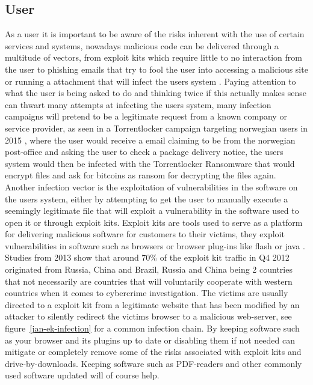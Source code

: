 \subsection{User}
As a user it is important to be aware of the risks inherent with the use of certain services and systems, nowadays malicious code can be delivered through a multitude of vectors, from exploit kits which require little to no interaction from the user to phishing emails that try to fool the user into accessing a malicious site or running a attachment that will infect the users system \cite{jan-brewer}. 
Paying attention to what the user is being asked to do and thinking twice if this actually makes sense can thwart many attempts at infecting the users system, many infection campaigns will pretend to be a legitimate request from a known company or service provider, as seen in a Torrentlocker campaign targeting norwegian users in 2015 \cite{jan-nsm-ransomware}, where the user would receive a email claiming to be from the norwegian post-office and asking the user to check a package delivery notice, the users system would then be infected with the Torrentlocker Ransomware that would encrypt files and ask for bitcoins as ransom for decrypting the files again. 
\\

Another infection vector is the exploitation of vulnerabilities in the software on the users system, either by attempting to get the user to manually execute a seemingly legitimate file that will exploit a vulnerability in the software used to open it or through exploit kits.
Exploit kits are tools used to serve as a platform for delivering malicious software for customers to their victims, they exploit vulnerabilities in software such as browsers or browser plug-ins like flash or java \cite{jan-kotov-ek}. Studies from 2013 show that around 70\% of the exploit kit traffic in Q4 2012 originated from Russia, China and Brazil\cite{jan-ek-source}, Russia and China being 2 countries that not necessarily are countries that will voluntarily cooperate with western countries when it comes to cybercrime investigation.  The victims are usually directed to a exploit kit from a legitimate website that has been modified by an attacker to silently redirect the victims browser to a malicious web-server, see figure~\ref{jan-ek-infection} for a common infection chain. By keeping software such as your browser and its plugins up to date or disabling them if not needed can mitigate or completely remove some of the risks associated with exploit kits and drive-by-downloads. Keeping software such as PDF-readers and other commonly used software updated will of course help.


